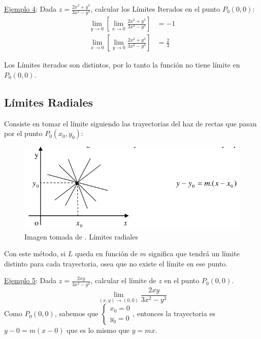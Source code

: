 \documentclass[12pt]{article}
\begin{document}
\underline{Ejemplo 4}:
Dada $ z = \frac{2x^{2} + y^{3}}{3x^{2} - y^{3}} $, calcular los Límites Iterados en el punto $ P_{0}(0,0) $:
\begin{align*}
	\lim_{y \to 0}{\left[\lim_{x \to 0}{\frac{2x^{2} + y^{3}}{3x^{2} - y^{3}}}\right]} &= -1\\
	\lim_{x \to 0}{\left[\lim_{y \to 0}{\frac{2x^{2} + y^{3}}{3x^{2} - y^{3}}}\right]} &= \frac{2}{3}
\end{align*}

Los Límites iterados son distintos, por lo tanto la función no tiene límite en $ P_{0}(0,0) $.


\subsection{Límites Radiales}
Consiste en tomar el límite siguiendo las trayectorias del haz de rectas que pasan por el punto $ P_{0}(x_{0}, y_{0}) $:

\begin{figure}[H]
  \centering
  \includegraphics[width=0.5\linewidth]{imagenes/limites_radiales.png}
  \caption{Imagen tomada de \parencite{am2monllor}. Límites radiales}
  \label{fig:limites_radiales}
\end{figure}

Con este método, si $ L $ queda en función de $ m $ significa que tendrá un límite distinto para cada trayectoria, osea que no existe el límite en ese punto.

\underline{Ejemplo 5}:
Dada $ z = \frac{2xy}{3x^{2} - y^{2}} $, calcular el límite de $ z $ en el punto $ P_{0}(0,0) $.
\[
\lim_{(x,y) \to (0,0)}{\frac{2xy}{3x^{2} - y^{2}}}
\]
Como $ P_{0}(0,0) $, sabemos que $ \begin{cases}
  x_{0} = 0 \\
  y_{0} = 0
\end{cases} $, entonces la trayectoria es $ y - 0 = m(x-0) $ que es lo mismo que $ y = mx $.
\end{document}
